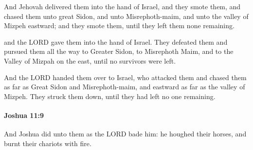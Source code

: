 			\begin{versebox}
					\item[BHS] 
					\item[ASV] And Jehovah delivered them into the hand of Israel, and they smote them, and chased them unto great Sidon, and unto Misrephoth-maim, and unto the valley of Mizpeh eastward; and they smote them, until they left them none remaining.
					\item[NIV] and the LORD gave them into the hand of Israel. They defeated them and pursued them all the way to Greater Sidon, to Misrephoth Maim, and to the Valley of Mizpah on the east, until no survivors were left.
					\item[NRSV] And the LORD handed them over to Israel, who attacked them and chased them as far as Great Sidon and Misrephoth-maim, and eastward as far as the valley of Mizpeh. They struck them down, until they had left no one remaining.
			\end{versebox}

		\paragraph{Joshua 11:9} %
			\label{JOSHUA-11-9}

			And Joshua did unto them as the LORD bade him: he houghed their horses, and burnt their chariots with fire.

